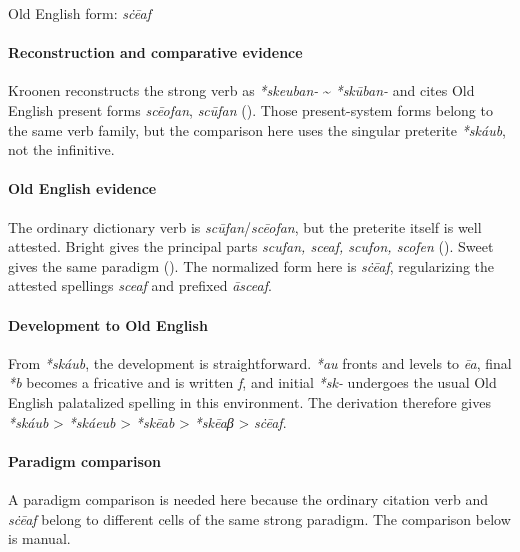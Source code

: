 \documentclass[
  british,
  a4paper,
]{article}
\begin{document}
Old English form: \emph{sċēaf}

\paragraph{Reconstruction and comparative
evidence}\label{reconstruction-and-comparative-evidence-54}

Kroonen reconstructs the strong verb as \emph{*skeuban-}
\textasciitilde{} \emph{*skūban-} and cites Old English present forms
\emph{scēofan}, \emph{scūfan} (). Those present-system forms belong to the same verb family, but
the comparison here uses the singular preterite \emph{*skáub}, not the
infinitive.

\paragraph{Old English evidence}\label{old-english-evidence-54}

The ordinary dictionary verb is \emph{scūfan}/\emph{scēofan}, but the
preterite itself is well attested. Bright gives the principal parts
\emph{scufan, sceaf, scufon, scofen}
(). Sweet gives
the same paradigm (). The
normalized form here is \emph{sċēaf}, regularizing the attested
spellings \emph{sceaf} and prefixed \emph{āsceaf}.

\paragraph{Development to Old
English}\label{development-to-old-english-54}

From \emph{*skáub}, the development is straightforward. \emph{*au}
fronts and levels to \emph{ēa}, final \emph{*b} becomes a fricative and
is written \emph{f}, and initial \emph{*sk-} undergoes the usual Old
English palatalized spelling in this environment. The derivation
therefore gives \emph{*skáub} \textgreater{} \emph{*skáeub}
\textgreater{} \emph{*skēab} \textgreater{} \emph{*skēaβ} \textgreater{}
\emph{sċēaf}.

\paragraph{Paradigm comparison}\label{paradigm-comparison-15}

A paradigm comparison is needed here because the ordinary citation verb
and \emph{sċēaf} belong to different cells of the same strong paradigm.
The comparison below is manual.
\end{document}
